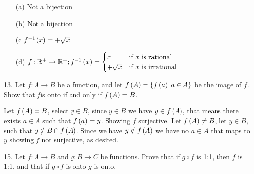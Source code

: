 \begin{mdframed}[style=darkAnswer,frametitle={Joe Starr}]
  \begin{itemize}
    \item [(a)]{
      Not a bijection
    }
    \item [(b)]{
      Not a bijection 
    }
    \item [(c]{
      $f^{-1}\left(x\right)=+\sqrt{x}$
    }
    \item [(d)]{
      $f:\mathbb{R}^+\to \mathbb{R}^+; f^{-1}\left(x\right)=
      \begin{cases}
        x &\text{if }x\text{ is rational}\\
        +\sqrt{x} &\text{if }x\text{ is irrational}\\
      \end{cases}$
    }
  \end{itemize}
\end{mdframed}
\newpage
\begin{mdframed}[style=darkQuesion]
  13. Let $f:A\to B$ be a function, and let $f\left(A\right)=\left\{f\left(a\right)\vert a\in A\right\}$
  be the image of $f$. Show that $f$is onto if and only if $f\left(A\right)=B$.
\end{mdframed}

\begin{mdframed}[style=darkAnswer,frametitle={Joe Starr}]
Let $f\left(A\right)=B$, select $y\in B$, since $y\in B$ we have $y\in f\left(A\right)$, that 
means there exists $a\in A$ such that $f\left(a\right)=y$. Showing $f$ surjective. 
Let $f\left(A\right)\neq B$, let $y\in B$, such that $y\notin B \cap f\left(A\right)$. Since we
have $y\notin f\left(A\right)$ we have no $a\in A$ that maps to $y$ showing $f$ not 
surjective, as desired.  
\end{mdframed}
\newpage
\begin{mdframed}[style=darkQuesion]
  15. Let $f:A\to B$ and $g:B\to C$ be functions. Prove that if $g\circ f$ is 
  1:1, then $f$ is 1:1, and that if $g\circ f$ is onto $g$ is onto.
\end{mdframed}

